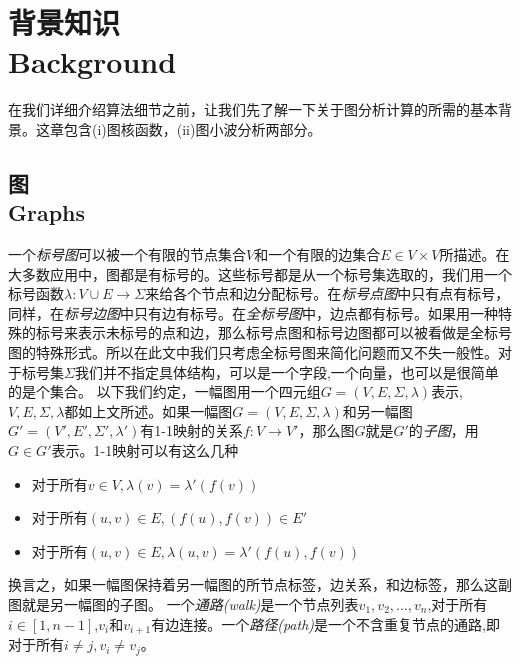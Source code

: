 \documentclass{article}
\begin{document}
\else
\fi
\chapter{背景知识 \\ Background}
在我们详细介绍算法细节之前，让我们先了解一下关于图分析计算的所需的基本背景。这章包含(i)图核函数，(ii)图小波分析两部分。
\section{图 \\ Graphs}
一个\emph{标号图}可以被一个有限的节点集合$V$和一个有限的边集合$E\in V\times V$所描述。在大多数应用中，图都是有标号的。这些标号都是从一个标号集选取的，我们用一个标号函数$\lambda :V\cup E\rightarrow \Sigma$来给各个节点和边分配标号。在\emph{标号点图}中只有点有标号，同样，在\emph{标号边图}中只有边有标号。在\emph{全标号图}中，边点都有标号。如果用一种特殊的标号来表示未标号的点和边，那么标号点图和标号边图都可以被看做是全标号图的特殊形式。所以在此文中我们只考虑全标号图来简化问题而又不失一般性。对于标号集$\Sigma$我们并不指定具体结构，可以是一个字段,一个向量，也可以是很简单的是个集合。
以下我们约定，一幅图用一个四元组$G=(V,E,\Sigma ,\lambda )$表示,$V,E,\Sigma,\lambda$都如上文所述。如果一幅图$G=(V,E,\Sigma,\lambda)$和另一幅图$G'=(V',E',\Sigma',\lambda')$有1-1映射的关系$f:V\rightarrow V'$，那么图$G$就是$G'$的\emph{子图}，用$G\in G' $表示。1-1映射可以有这么几种
\begin{itemize}
    \item 对于所有$v\in V,\lambda(v)=\lambda '(f(v))$
    \item 对于所有$(u,v)\in E,(f(u),f(v))\in E'$
    \item 对于所有$(u,v)\in E,\lambda(u,v)=\lambda '(f(u),f(v)) $
\end{itemize}
换言之，如果一幅图保持着另一幅图的所节点标签，边关系，和边标签，那么这副图就是另一幅图的子图。
一个\emph{通路(walk)}是一个节点列表$v_1,v_2,...,v_n$,对于所有$i\in [1,n-1]$,$v_i$和$v_{i+1}$有边连接。一个\emph{路径(path)}是一个不含重复节点的通路,即对于所有$i\neq j,v_i \neq v_j$。
\end{document}
